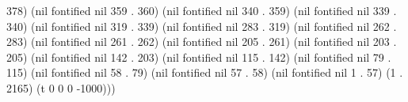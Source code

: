 378) (nil fontified nil 359 . 360) (nil fontified nil 340 . 359) (nil fontified nil 339 . 340) (nil fontified nil 319 . 339) (nil fontified nil 283 . 319) (nil fontified nil 262 . 283) (nil fontified nil 261 . 262) (nil fontified nil 205 . 261) (nil fontified nil 203 . 205) (nil fontified nil 142 . 203) (nil fontified nil 115 . 142) (nil fontified nil 79 . 115) (nil fontified nil 58 . 79) (nil fontified nil 57 . 58) (nil fontified nil 1 . 57) (1 . 2165) (t 0 0 0 -1000)))
